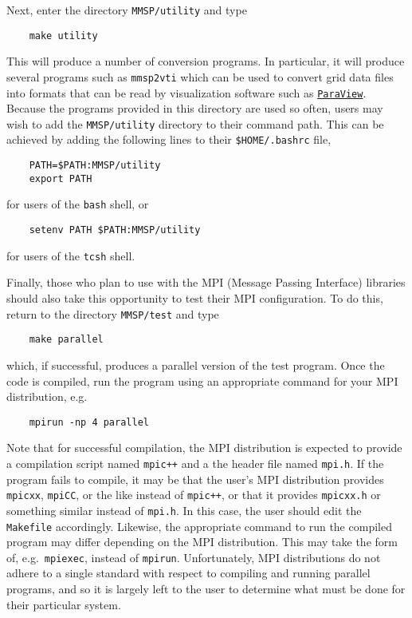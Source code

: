 Next, enter the directory {\tt MMSP/utility} and type
\begin{shadebox}
\begin{verbatim}
    make utility
\end{verbatim}
\end{shadebox}
This will produce a number of conversion programs.  In particular, it will produce several programs such as {\tt mmsp2vti} which can be used to convert \MMSP grid data files into formats that can be read by visualization software such as \href{http://www.paraview.org}{\tt ParaView}.  Because the programs provided in this directory are used so often, \MMSP users may wish to add the {\tt MMSP/utility} directory to their command path.  This can be achieved by adding the following lines to their {\tt \$HOME/.bashrc} file,
\begin{shadebox}
\begin{verbatim}
    PATH=$PATH:MMSP/utility
    export PATH
\end{verbatim}
\end{shadebox}
for users of the {\tt bash} shell, or
\begin{shadebox}
\begin{verbatim}
    setenv PATH $PATH:MMSP/utility
\end{verbatim}
\end{shadebox}
for users of the {\tt tcsh} shell.

Finally, those who plan to use \MMSP with the MPI (Message Passing Interface) libraries should also take this opportunity to test their MPI configuration.  To do this, return to the directory {\tt MMSP/test} and type
\begin{shadebox}
\begin{verbatim}
    make parallel
\end{verbatim}
\end{shadebox}
which, if successful, produces a parallel version of the test program.  Once the code is compiled, run the program using an appropriate command for your MPI distribution, e.g.\
\begin{shadebox}
\begin{verbatim}
    mpirun -np 4 parallel
\end{verbatim}
\end{shadebox}
Note that for successful compilation, the MPI distribution is expected to provide a compilation script named {\tt mpic++} and a the header file named {\tt mpi.h}.  If the program fails to compile, it may be that the user's MPI distribution provides {\tt mpicxx}, {\tt mpiCC}, or the like instead of {\tt mpic++}, or that it provides {\tt mpicxx.h} or something similar instead of {\tt mpi.h}.  In this case, the user should edit the {\tt Makefile} accordingly.  Likewise, the appropriate command to run the compiled program may differ depending on the MPI distribution.  This may take the form of, e.g.\ {\tt mpiexec}, instead of {\tt mpirun}.  Unfortunately, MPI distributions do not adhere to a single standard with respect to compiling and running parallel programs, and so it is largely left to the user to determine what must be done for their particular system.

